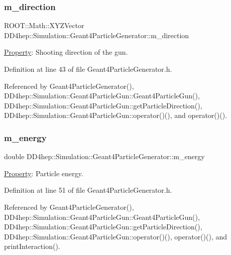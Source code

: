 \subsubsection{\texorpdfstring{m\+\_\+direction}{m\_direction}}
{\footnotesize\ttfamily R\+O\+O\+T\+::\+Math\+::\+X\+Y\+Z\+Vector D\+D4hep\+::\+Simulation\+::\+Geant4\+Particle\+Generator\+::m\+\_\+direction\hspace{0.3cm}{\ttfamily [protected]}}



\hyperlink{class_d_d4hep_1_1_property}{Property}\+: Shooting direction of the gun. 



Definition at line 43 of file Geant4\+Particle\+Generator.\+h.



Referenced by Geant4\+Particle\+Generator(), D\+D4hep\+::\+Simulation\+::\+Geant4\+Particle\+Gun\+::\+Geant4\+Particle\+Gun(), D\+D4hep\+::\+Simulation\+::\+Geant4\+Particle\+Gun\+::get\+Particle\+Direction(), D\+D4hep\+::\+Simulation\+::\+Geant4\+Particle\+Gun\+::operator()(), and operator()().

\hypertarget{class_d_d4hep_1_1_simulation_1_1_geant4_particle_generator_a0177e67af8736780fa0e401d598a792f}{}\label{class_d_d4hep_1_1_simulation_1_1_geant4_particle_generator_a0177e67af8736780fa0e401d598a792f} 
\subsubsection{\texorpdfstring{m\+\_\+energy}{m\_energy}}
{\footnotesize\ttfamily double D\+D4hep\+::\+Simulation\+::\+Geant4\+Particle\+Generator\+::m\+\_\+energy\hspace{0.3cm}{\ttfamily [protected]}}



\hyperlink{class_d_d4hep_1_1_property}{Property}\+: Particle energy. 



Definition at line 51 of file Geant4\+Particle\+Generator.\+h.



Referenced by Geant4\+Particle\+Generator(), D\+D4hep\+::\+Simulation\+::\+Geant4\+Particle\+Gun\+::\+Geant4\+Particle\+Gun(), D\+D4hep\+::\+Simulation\+::\+Geant4\+Particle\+Gun\+::get\+Particle\+Direction(), D\+D4hep\+::\+Simulation\+::\+Geant4\+Particle\+Gun\+::operator()(), operator()(), and print\+Interaction().

